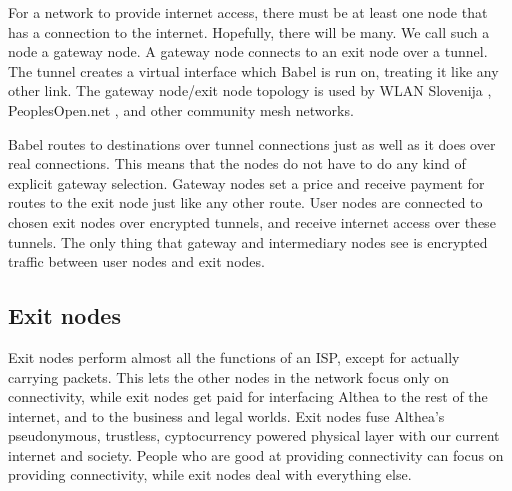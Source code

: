 \documentclass[11pt]{article}
\newlength{\currentparskip}
\newenvironment{unbreakable}
  {\setlength{\currentparskip}{\parskip}%
	 \vspace{\currentparskip}
   \begin{minipage}{\textwidth}%
   \setlength{\parskip}{\currentparskip}%
  }
  {\end{minipage}\vspace{\currentparskip}}
\begin{document}
For a network to provide internet access, there must be at least one node that has a connection to the internet. Hopefully, there will be many. We call such a node a gateway node. A gateway node connects to an exit node over a tunnel. The tunnel creates a virtual interface which Babel is run on, treating it like any other link. The gateway node/exit node topology \cite{exittopology} is used by WLAN Slovenija \cite{wlanslovenija}, PeoplesOpen.net \cite{pplsopen}, and other community mesh networks.


\begin{figure}[h]
\end{figure}

Babel routes to destinations over tunnel connections just as well as it does over real connections. This means that the nodes do not have to do any kind of explicit gateway selection. Gateway nodes set a price and receive payment for routes to the exit node just like any other route. User nodes are connected to chosen exit nodes over encrypted tunnels, and receive internet access over these tunnels. The only thing that gateway and intermediary nodes see is encrypted traffic between user nodes and exit nodes.


\subsection{Exit nodes}
Exit nodes perform almost all the functions of an ISP, except for actually carrying packets. This lets the other nodes in the network focus only on connectivity, while exit nodes get paid for interfacing Althea to the rest of the internet, and to the business and legal worlds. Exit nodes fuse Althea’s pseudonymous, trustless, cyptocurrency powered physical layer with our current internet and society. People who are good at providing connectivity can focus on providing connectivity, while exit nodes deal with everything else. 
\end{document}
